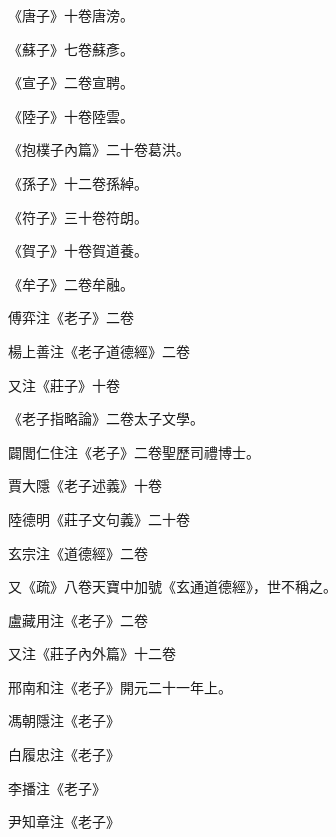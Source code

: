 \begin{pinyinscope}
 《唐子》十卷唐滂。



 《蘇子》七卷蘇彥。



 《宣子》二卷宣聘。



 《陸子》十卷陸雲。



 《抱樸子內篇》二十卷葛洪。



 《孫子》十二卷孫綽。



 《符子》三十卷符朗。



 《賀子》十卷賀道養。



 《牟子》二卷牟融。



 傅弈注《老子》二卷



 楊上善注《老子道德經》二卷



 又注《莊子》十卷



 《老子指略論》二卷太子文學。



 闢閭仁住注《老子》二卷聖歷司禮博士。



 賈大隱《老子述義》十卷



 陸德明《莊子文句義》二十卷



 玄宗注《道德經》二卷



 又《疏》八卷天寶中加號《玄通道德經》，世不稱之。



 盧藏用注《老子》二卷



 又注《莊子內外篇》十二卷



 邢南和注《老子》開元二十一年上。



 馮朝隱注《老子》



 白履忠注《老子》



 李播注《老子》



 尹知章注《老子》




\end{pinyinscope}
